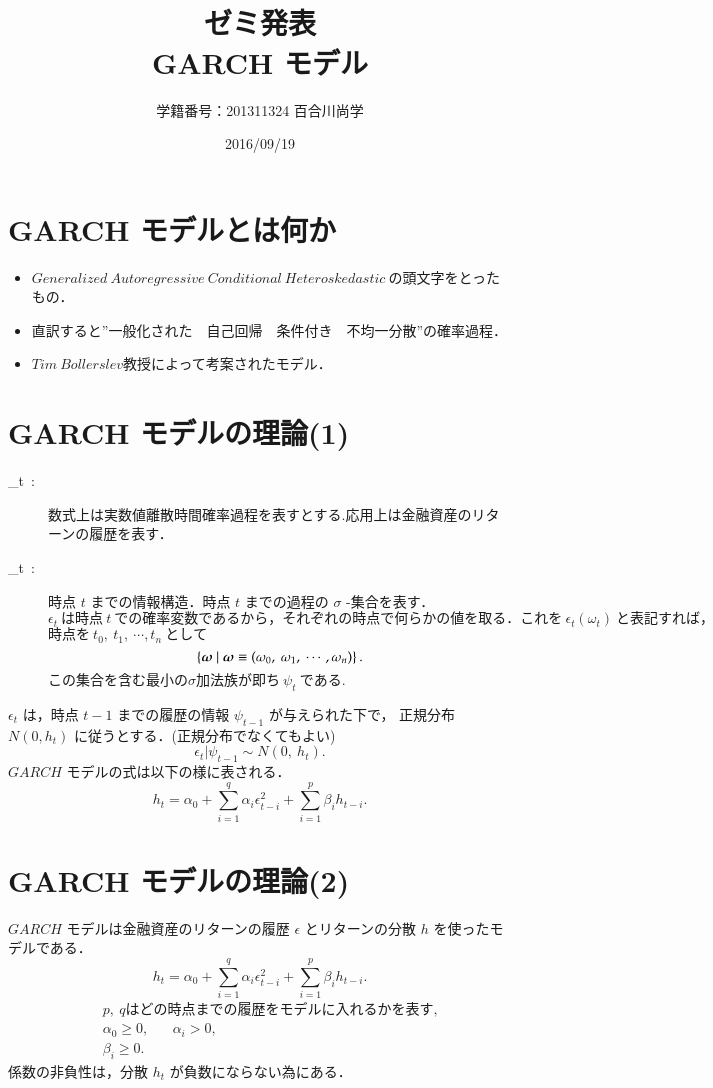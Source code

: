 \documentclass[slide,10pt]{jsarticle}
\def\vector#1{\mbox{\boldmath $#1$}}
\def\sheet #1{\section*{\centering \large \bfseries #1}}
\begin{document}
\title{\fontsize{45pt}{2cm}\selectfont \\ゼミ発表\\GARCH モデル\\}
\author{\Huge 学籍番号：201311324 百合川尚学}
\date{\Huge 2016/09/19}
\maketitle

\sheet{\Huge GARCH モデルとは何か}

{\huge
\begin{itemize}
	\vspace{5mm}
	\item $Generalized\ Autoregressive\ Conditional\ Heteroskedastic\ $の頭文字をとったもの．
	\vspace{5mm}
	\item 直訳すると''一般化された　自己回帰　条件付き　不均一分散''の確率過程．
	\vspace{5mm}
	\item $Tim\ Bollerslev$教授によって考案されたモデル．
\end{itemize}
}

\sheet{\Huge GARCH モデルの理論(1)}

{\huge
\begin{description}
	\item[{\Huge \epsilon_t}\ :\ ] 数式上は実数値離散時間確率過程を表すとする.応用上は金融資産のリターンの履歴を表す．
	\item[{\Huge \psi_t}\ :\ ] 時点 $t$ までの情報構造．時点 $t$ までの過程の $\sigma$ -集合を表す．\\
		$\epsilon_t\ は時点\ t\ での確率変数であるから，それぞれの時点で何らかの値を取る．これを\ \epsilon_t(\omega_t)\ と表記すれば，$
		$時点を\ t_0,\ t_1,\ \cdots,t_n\ として$
		\[
			\left\{\vector{\omega}\ |\ \vector{\omega} \equiv (\omega_0,\ \omega_1,\ \cdots,\omega_n) \right\}.
		\]
		$この集合を含む最小の \sigma 加法族が即ち\ \psi_t\ である.$
\end{description}
$\epsilon_t$ は，時点 $t-1$ までの履歴の情報 $\psi_{t-1}$ が与えられた下で， 正規分布 $N(0, h_t)$ に従うとする．(正規分布でなくてもよい)
\[
	\epsilon_t|\psi_{t-1} \sim N(0,\ h_t).
\]
$GARCH$ モデルの式は以下の様に表される．
\[
	h_t = \alpha_0 + \sum_{i=1}^{q} \alpha_i \epsilon_{t-i}^2 + \sum_{i=1}^{p} \beta_i h_{t-i}.
\]
}

\sheet{\Huge GARCH モデルの理論(2)}

{\huge
$GARCH$ モデルは金融資産のリターンの履歴 $\epsilon$ とリターンの分散 $h$ を使ったモデルである．
\[
	h_t = \alpha_0 + \sum_{i=1}^{q} \alpha_i \epsilon_{t-i}^2 + \sum_{i=1}^{p} \beta_i h_{t-i}.
\]
\begin{eqnarray*}
	&& p,\ q はどの時点までの履歴をモデルに入れるかを表す,\\
	&& \alpha_0 \geq 0, \hspace{20pt} \alpha_i > 0, \\
	&& \beta_i \geq 0.
\end{eqnarray*}
係数の非負性は，分散 $h_t$ が負数にならない為にある．
}
\end{document}
